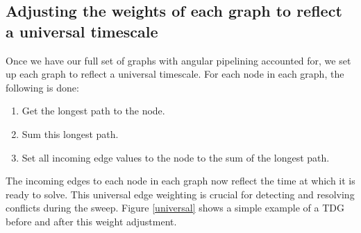\subsection{Adjusting the weights of each graph to reflect a universal timescale}

Once we have our full set of graphs with angular pipelining accounted for, we set up each graph to reflect a universal timescale. For each node in each graph, the following is done:
\begin{enumerate}
  \item Get the longest path to the node.
  \item Sum this longest path.
  \item Set all incoming edge values to the node to the sum of the longest path. 
\end{enumerate}
The incoming edges to each node in each graph now reflect the time at which it is ready to solve. This universal edge weighting is crucial for detecting and resolving conflicts during the sweep. Figure \ref{universal} shows a simple example of a TDG before and after this weight adjustment.
